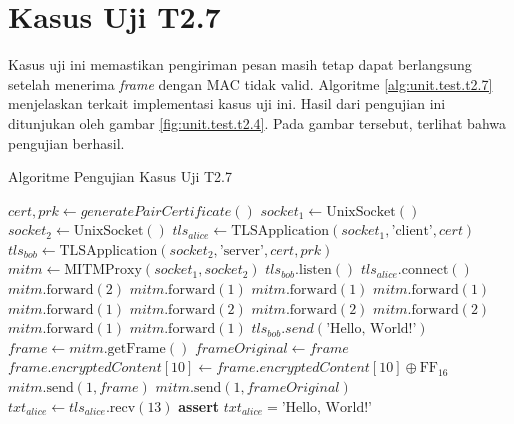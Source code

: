 \section{Kasus Uji T2.7}

Kasus uji ini memastikan pengiriman pesan masih tetap dapat berlangsung setelah menerima \emph{frame} dengan MAC tidak valid. Algoritme \ref{alg:unit.test.t2.7} menjelaskan terkait implementasi kasus uji ini. Hasil dari pengujian ini ditunjukan oleh gambar \ref{fig:unit.test.t2.4}. Pada gambar tersebut, terlihat bahwa pengujian berhasil.


\begin{algorithm}
  \caption{Algoritme Pengujian Kasus Uji T2.7}
  \label{alg:unit.test.t2.7}
  \begin{algorithmic}
    \State $cert, prk \gets generatePairCertificate()$
    \State $socket_1 \gets \text{UnixSocket}()$
    \State $socket_2 \gets \text{UnixSocket}()$
    \State $tls_{alice} \gets \text{TLSApplication}(socket_1, \text{'client'}, cert)$ 
    \State $tls_{bob} \gets \text{TLSApplication}(socket_2, \text{'server'}, cert, prk)$
    \State $mitm \gets \text{MITMProxy}(socket_1, socket_2)$
    \State
    \State $tls_{bob}.\text{listen}()$  
    \State $tls_{alice}.\text{connect}()$  
    \State
    \State $mitm.\text{forward}(2)$ 
    \State $mitm.\text{forward}(1)$ 
    \State $mitm.\text{forward}(1)$ 
    \State $mitm.\text{forward}(1)$ 
    \State $mitm.\text{forward}(1)$ 
    \State $mitm.\text{forward}(2)$ 
    \State $mitm.\text{forward}(2)$ 
    \State $mitm.\text{forward}(2)$ 
    \State $mitm.\text{forward}(1)$ 
    \State $mitm.\text{forward}(1)$ 
    \State
    \State $tls_{bob}.send(\text{'Hello, World!'})$
    \State $frame \gets mitm.\text{getFrame}()$
    \State $frameOriginal \gets frame$
    \State $frame.encryptedContent[10] \gets frame.encryptedContent[10] \oplus \text{FF}_{16}$ 
    \State $mitm.\text{send}(1, frame)$
    \State $mitm.\text{send}(1, frameOriginal)$
    \State
    \State $txt_{alice} \gets tls_{alice}.\text{recv}(13)$
    \State \textbf{assert} $txt_{alice} = \text{'Hello, World!'}$
  \end{algorithmic}
\end{algorithm}

